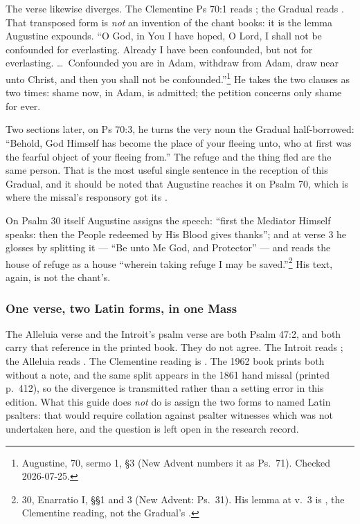 The verse likewise diverges. The Clementine Ps 70:1 reads ; the Gradual reads . That transposed form is \emph{not}
an invention of the chant books: it is the lemma Augustine expounds. ``O God,
in You I have hoped, O Lord, I shall not be confounded for everlasting. Already
I have been confounded, but not for everlasting. \dots\ Confounded you are in
Adam, withdraw from Adam, draw near unto Christ, and then you shall not be
confounded.''\footnote{Augustine,  70, sermo 1, §3 (New
Advent numbers it as Ps.\ 71). Checked 2026-07-25.} He takes the two clauses as
two times: shame now, in Adam, is admitted; the petition concerns only shame
for ever.

Two sections later, on Ps 70:3, he turns the very noun the Gradual
half-borrowed: ``Behold, God Himself has become the place of your fleeing unto,
who at first was the fearful object of your fleeing from.'' The refuge and the
thing fled are the same person. That is the most useful single sentence in the
reception of this Gradual, and it should be noted that Augustine reaches it on
Psalm 70, which is where the missal's responsory got its .

On Psalm 30 itself Augustine assigns the speech: ``first the Mediator Himself
speaks: then the People redeemed by His Blood gives thanks''; and at verse 3 he
glosses  by splitting it --- ``Be unto Me
God, and Protector'' --- and reads the house of refuge as a house ``wherein
taking refuge I may be saved.''\footnote{ 30, Enarratio I,
§§1 and 3 (New Advent: Ps.\ 31). His lemma at v.\ 3 is , the Clementine reading, not the Gradual's .}
His text, again, is not the chant's.

\subsubsection*{One verse, two Latin forms, in one Mass}

The Alleluia verse and the Introit's psalm verse are both Psalm 47:2, and both
carry that reference in the printed book. They do not agree. The Introit reads
; the Alleluia reads . The
Clementine reading is . The 1962 book prints both without a note,
and the same split appears in the 1861 hand missal (printed p.\ 412), so the
divergence is transmitted rather than a setting error in this edition. What
this guide does \emph{not} do is assign the two forms to named Latin psalters:
that would require collation against psalter witnesses which was not undertaken
here, and the question is left open in the research record.


